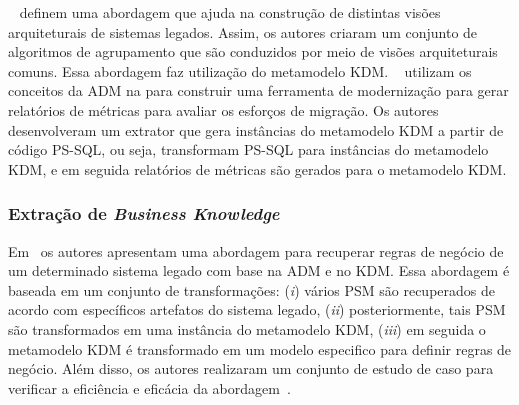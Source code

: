  
 
 
~ definem uma abordagem que ajuda na construção de distintas visões arquiteturais de sistemas legados. Assim, os autores criaram um conjunto de algoritmos de agrupamento que são conduzidos por meio de visões arquiteturais comuns. Essa abordagem faz
utilização do metamodelo KDM. ~ utilizam os conceitos da ADM na para construir uma ferramenta de modernização para gerar relatórios de métricas para avaliar os esforços de migração. Os autores desenvolveram um extrator que gera instâncias do metamodelo KDM a partir de código PS-SQL, ou seja, transformam PS-SQL para instâncias do metamodelo KDM, e em seguida relatórios de métricas são gerados para o metamodelo KDM.

 

\subsubsection{Extração de \textit{Business Knowledge}}
\label{ssub:Business_Knowledge_Extraction}

Em~\cite{Perez-Castillo:2011:ECS:1982185.1982249,6080834, 6498507,Perez-Castillo:2010:IBP:1875847.1875861} os autores apresentam uma abordagem para recuperar regras de negócio de um determinado sistema legado com base na ADM e no KDM. Essa abordagem é baseada em um conjunto de transformações: (\textit{i}) vários PSM são recuperados de acordo com específicos artefatos do sistema legado, (\textit{ii}) posteriormente, tais PSM são transformados em uma instância do metamodelo KDM, (\textit{iii}) em seguida o metamodelo KDM é transformado em um modelo especifico para definir regras de negócio. Além disso, os autores realizaram um conjunto de estudo de caso para verificar a eficiência e eficácia da abordagem~\cite{PerezCastillo20121370}.

